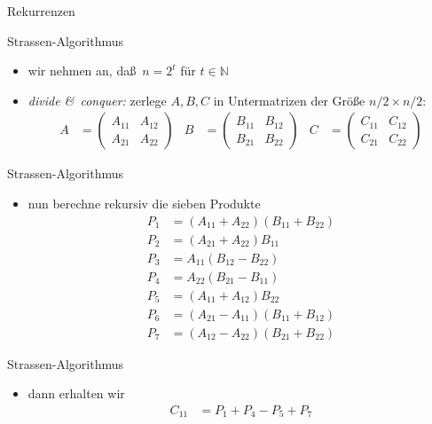 \documentclass[aspectratio=1610, 11pt]{beamer}
\newcommand\NN{\mathbb N}
\begin{document}
\begin{frame}{Rekurrenzen}
	\begin{overprint}
		\begin{exampleblock}{Strassen-Algorithmus}
			\begin{itemize}
				\item wir nehmen an, da\ss\ $n=2^t$ f\"ur $t\in\NN$
				\item {\em divide \&\ conquer:} zerlege $A,B,C$ in Untermatrizen der Gr\"o\ss e $n/2\times n/2$:
					\begin{align*}
						A&=\begin{pmatrix}A_{11}&A_{12}\\A_{21}&A_{22}\end{pmatrix}&
						B&=\begin{pmatrix}B_{11}&B_{12}\\B_{21}&B_{22}\end{pmatrix}&
						C&=\begin{pmatrix}C_{11}&C_{12}\\C_{21}&C_{22}\end{pmatrix}
					\end{align*}
			\end{itemize}
		\end{exampleblock}
		\begin{exampleblock}{Strassen-Algorithmus}
			\begin{itemize}
				\item nun berechne rekursiv die sieben Produkte
					\begin{align*}
						P_1&=(A_{11}+A_{22})(B_{11}+B_{22})\\
						P_2&=(A_{21}+A_{22})B_{11}\\
						P_3&=A_{11}(B_{12}-B_{22})\\
						P_4&=A_{22}(B_{21}-B_{11})\\
						P_5&=(A_{11}+A_{12})B_{22}\\
						P_6&=(A_{21}-A_{11})(B_{11}+B_{12})\\
						P_7&=(A_{12}-A_{22})(B_{21}+B_{22})
					\end{align*}
			\end{itemize}
		\end{exampleblock}
		\begin{exampleblock}{Strassen-Algorithmus}
			\begin{itemize}
				\item dann erhalten wir
					\begin{align*}
						C_{11}&=P_1+P_4-P_5+P_7\\

\end{align*}
\end{itemize}
\end{exampleblock}
\end{overprint}
\end{frame}
\end{document}
